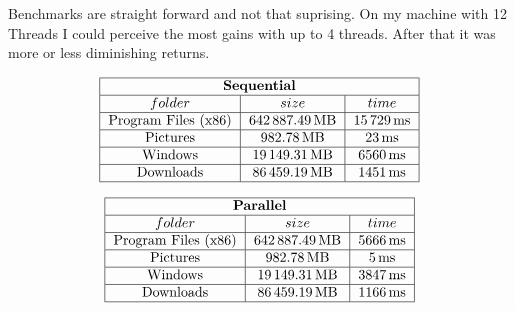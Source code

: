 \documentclass{article}
\begin{document}
    Benchmarks are straight forward and not that suprising. On my machine with 12 Threads I could perceive the most gains with up to 4 threads. After that it was more or less diminishing returns.
    \\[24pt]
    \begin{doublespacing}
      \begin{align*}
        \begin{tabular}{|*{3}{c|}}
          \hline
          \multicolumn{3}{|c|}{\bfseries Sequential} \\
          \hline
          $folder$ & $size$ & $time$ \\
          \hline
          Program Files (x86) & $\SI{642887.49}{\mega\byte}$ & $\SI{15729}{\milli\second}$ \\
          \hline
          Pictures & $\SI{982.78}{\mega\byte}$ & $\SI{23}{\milli\second}$ \\
          \hline
          Windows & $\SI{19149.31}{\mega\byte}$ & $\SI{6560}{\milli\second}$ \\
          \hline
          Downloads & $\SI{86459.19}{\mega\byte}$ & $\SI{1451}{\milli\second}$ \\
          \hline
        \end{tabular}
      \end{align*}
    \end{doublespacing}
    \begin{doublespacing}
      \begin{align*}
        \begin{tabular}{|*{3}{c|}}
          \hline
          \multicolumn{3}{|c|}{\bfseries Parallel} \\
          \hline
          $folder$ & $size$ & $time$ \\
          \hline
          Program Files (x86) & $\SI{642887.49}{\mega\byte}$ & $\SI{5666}{\milli\second}$ \\
          \hline
          Pictures & $\SI{982.78}{\mega\byte}$ & $\SI{5}{\milli\second}$ \\
          \hline
          Windows & $\SI{19149.31}{\mega\byte}$ & $\SI{3847}{\milli\second}$ \\
          \hline
          Downloads & $\SI{86459.19}{\mega\byte}$ & $\SI{1166}{\milli\second}$ \\
          \hline
        \end{tabular}
      \end{align*}
    \end{doublespacing}
\end{document}
